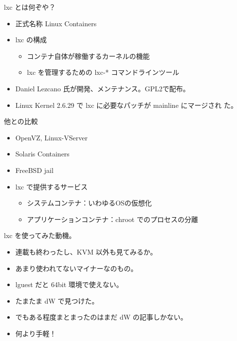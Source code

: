 \frame{\titlepage{}}

\begin{frame}{lxc とは何ぞや？}
\begin{itemize}
 \item 正式名称 Linux Containers
 \item lxc の構成
       \begin{itemize}
	\item コンテナ自体が稼働するカーネルの機能
	\item lxc を管理するための lxc-* コマンドラインツール
       \end{itemize}
 \item Daniel Lezcano 氏が開発、メンテナンス。GPL2で配布。
 \item Linux Kernel 2.6.29 で lxc に必要なパッチが mainline にマージされ
       た。
\end{itemize}
\end{frame}

\begin{frame}{他との比較}
\begin{itemize}
 \item OpenVZ, Linux-VServer
 \item Solaris Containers
 \item FreeBSD jail
 \item lxc で提供するサービス
       \begin{itemize}
	\item システムコンテナ：いわゆるOSの仮想化
	\item アプリケーションコンテナ：chroot でのプロセスの分離
       \end{itemize}
\end{itemize}
\end{frame}

\begin{frame}{lxc を使ってみた動機。}
\begin{itemize}
 \item 連載も終わったし、KVM 以外も見てみるか。
 \item あまり使われてないマイナーなのもの。
 \item lguest だと 64bit 環境で使えない。
 \item たまたま dW で見つけた。
 \item でもある程度まとまったのはまだ dW の記事しかない。
 \item 何より手軽！
\end{itemize}
\end{frame}


